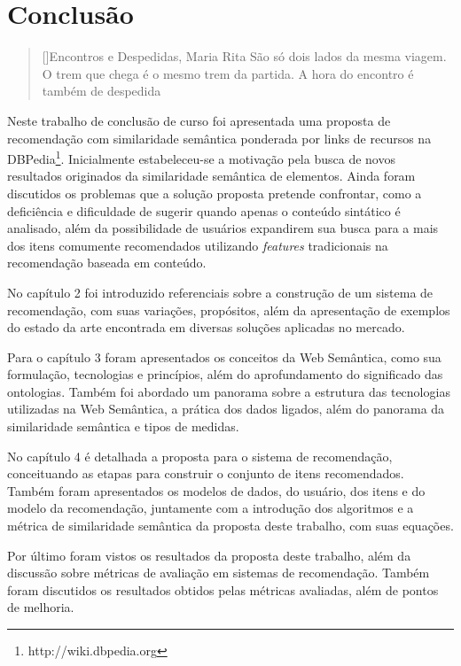 \chapter{Conclusão}
\label{cap:conclusion}

\begin{quotation}[]{Encontros e Despedidas, Maria Rita}
São só dois lados da mesma viagem. O trem que chega é o mesmo trem da partida. A hora do encontro é também de despedida
\end{quotation}

Neste trabalho de conclusão de curso foi apresentada uma proposta de recomendação com similaridade semântica ponderada por links de recursos na DBPedia\footnote{http://wiki.dbpedia.org}. Inicialmente estabeleceu-se a motivação pela busca de novos resultados originados da similaridade semântica de elementos. Ainda foram discutidos os problemas que a solução proposta pretende confrontar, como a deficiência e dificuldade de sugerir quando apenas o conteúdo sintático é analisado, além da possibilidade de usuários expandirem sua busca para a mais dos itens comumente recomendados utilizando \textit{features} tradicionais na recomendação baseada em conteúdo.

No capítulo 2 foi introduzido referenciais sobre a construção de um sistema de recomendação, com suas variações, propósitos, além da apresentação de exemplos do estado da arte encontrada em diversas soluções aplicadas no mercado.

Para o capítulo 3 foram apresentados os conceitos da Web Semântica, como sua formulação, tecnologias e princípios, além do aprofundamento do significado das ontologias. Também foi abordado um panorama sobre a estrutura das tecnologias utilizadas na Web Semântica, a prática dos dados ligados, além do panorama da similaridade semântica e tipos de medidas.

No capítulo 4 é detalhada a proposta para o sistema de recomendação, conceituando as etapas para construir o conjunto de itens recomendados. Também foram apresentados os modelos de dados, do usuário, dos itens e do modelo da recomendação, juntamente com a introdução dos algoritmos e a métrica de similaridade semântica da proposta deste trabalho, com suas equações.

Por último foram vistos os resultados da proposta deste trabalho, além da discussão sobre métricas de avaliação em sistemas de recomendação. Também foram discutidos os resultados obtidos pelas métricas avaliadas, além de pontos de melhoria.

